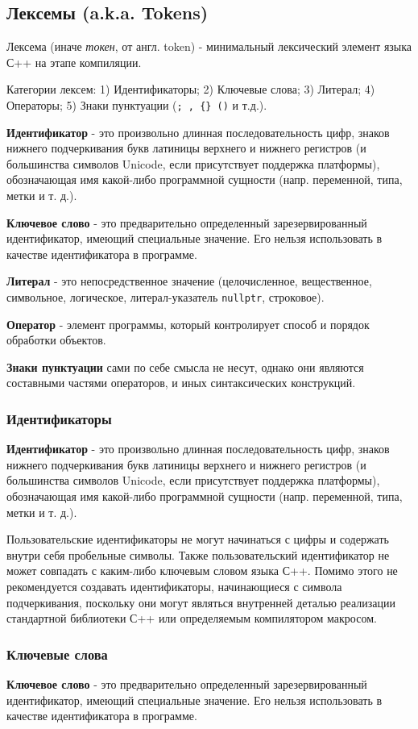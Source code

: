 \subsection{Лексемы (a.k.a. Tokens)}

Лексема (иначе \emph{токен}, от англ. token) - минимальный лексический
элемент языка С++ на этапе компиляции.

Категории лексем: 1) Идентификаторы; 2) Ключевые слова; 3) Литерал; 4)
Операторы; 5) Знаки пунктуации (\texttt{;\ ,\ \{\}\ ()} и т.д.).

\textbf{Идентификатор} - это произвольно длинная последовательность
цифр, знаков нижнего подчеркивания букв латиницы верхнего и нижнего
регистров (и большинства символов Unicode, если присутствует поддержка
платформы), обозначающая имя какой-либо программной сущности (напр.
переменной, типа, метки и т. д.).

\textbf{Ключевое слово} - это предварительно определенный
зарезервированный идентификатор, имеющий специальные значение. Его
нельзя использовать в качестве идентификатора в программе.

\textbf{Литерал} - это непосредственное значение (целочисленное,
вещественное, символьное, логическое, литерал-указатель
\texttt{nullptr}, строковое).

\textbf{Оператор} - элемент программы, который контролирует способ и
порядок обработки объектов.

\textbf{Знаки пунктуации} сами по себе смысла не несут, однако они
являются составными частями операторов, и иных синтаксических
конструкций.

\subsubsection{Идентификаторы}

\textbf{Идентификатор} - это произвольно длинная последовательность
цифр, знаков нижнего подчеркивания букв латиницы верхнего и нижнего
регистров (и большинства символов Unicode, если присутствует поддержка
платформы), обозначающая имя какой-либо программной сущности (напр.
переменной, типа, метки и т. д.).

Пользовательские идентификаторы не могут начинаться с цифры и содержать
внутри себя пробельные символы. Также пользовательский идентификатор не
может совпадать с каким-либо ключевым словом языка С++. Помимо этого не
рекомендуется создавать идентификаторы, начинающиеся с символа
подчеркивания, поскольку они могут являться внутренней деталью
реализации стандартной библиотеки С++ или определяемым компилятором
макросом.

\subsubsection{Ключевые слова}

\textbf{Ключевое слово} - это предварительно определенный
зарезервированный идентификатор, имеющий специальные значение. Его
нельзя использовать в качестве идентификатора в программе.
